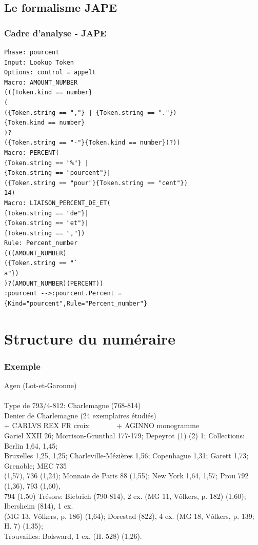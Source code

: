 \documentclass[10pt, compress]{beamer}
\begin{document}
\subsection{Le formalisme JAPE}
\begin{frame}[fragile]
\frametitle{Cadre d'analyse - JAPE}
\begin{scriptsize}
\begin{lstlisting}
Phase: pourcent
Input: Lookup Token
Options: control = appelt
Macro: AMOUNT_NUMBER
(({Token.kind == number}
(
({Token.string == ","} | {Token.string == "."})
{Token.kind == number}
)?
({Token.string == "-"}{Token.kind == number})?))
Macro: PERCENT(
{Token.string == "%"} |
{Token.string == "pourcent"}|
({Token.string == "pour"}{Token.string == "cent"})
14)
Macro: LIAISON_PERCENT_DE_ET(
{Token.string == "de"}|
{Token.string == "et"}|
{Token.string == ","})
Rule: Percent_number
(((AMOUNT_NUMBER)
({Token.string == "`
a"})
)?(AMOUNT_NUMBER)(PERCENT))
:pourcent -->:pourcent.Percent = {Kind="pourcent",Rule="Percent_number"}
\end{lstlisting}
\end{scriptsize}
\end{frame}
\section{Structure du numéraire}
\begin{frame}[fragile]
\frametitle{Exemple}
\begin{scriptsize}
Agen (Lot-et-Garonne)\\~\\

Type de 793/4-812: Charlemagne (768-814)\\
Denier de Charlemagne (24 exemplaires étudiés)\\
+ CARLVS REX FR croix~~~~~~~ + AGINNO monogramme\\
Gariel XXII 26; Morrison-Grunthal 177-179; Depeyrot (1) (2) 1; Collections: Berlin 1,64, 1,45;\\
Bruxelles 1,25, 1,25; Charleville-Mézières 1,56; Copenhague 1,31; Garett 1,73; Grenoble; MEC 735 \\
(1,57), 736 (1,24); Monnaie de Paris 88 (1,55); New York 1,64, 1,57; Prou 792 (1,36), 793 (1,60), \\
794 (1,50) Trésors: Biebrich (790-814), 2 ex. (MG 11, Vôlkers, p. 182) (1,60); Ibersheim (814), 1 ex. \\
(MG 13, Vôlkers, p. 186) (1,64); Dorestad (822), 4 ex. (MG 18, Vôlkers, p. 139; H. 7) (1,35);\\
Trouvailles: Bolsward, 1 ex. (H. 528) (1,26).
\end{scriptsize}
\end{frame}
\end{document}
